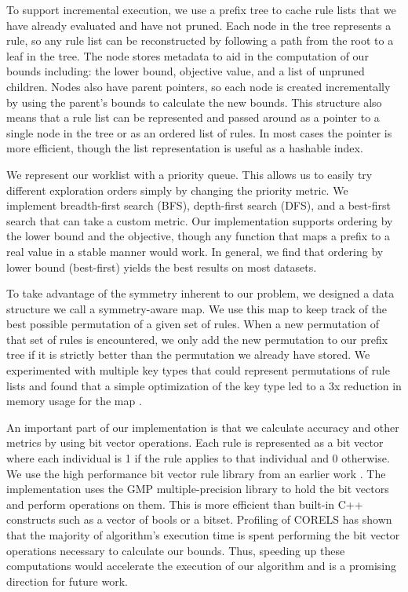 \documentclass[format=sigconf]{acmart}
\begin{document}
To support incremental execution, we use a prefix tree to cache rule lists that we have already evaluated and have not pruned.
Each node in the tree represents a rule, so any rule list can be reconstructed by following a path from the root to a leaf in the tree.
The node stores metadata to aid in the computation of our bounds including: the lower bound, objective value, and a list of unpruned children.
Nodes also have parent pointers, so each node is created incrementally by using the parent's bounds to calculate the new bounds.
This structure also means that a rule list can be represented and passed around as a pointer to a single node in the tree or as an ordered list of rules.
In most cases the pointer is more efficient, though the list representation is useful as a hashable index.

We represent our worklist with a priority queue.
This allows us to easily try different exploration orders simply by changing the priority metric.
We implement breadth-first search (BFS), depth-first search (DFS), and a best-first search that can take a custom metric.
Our implementation supports ordering by the lower bound and the objective, though any function that maps a prefix to a real value in a stable manner would work.
In general, we find that ordering by lower bound (best-first) yields the best results on most datasets.

To take advantage of the symmetry inherent to our problem, we designed a data structure we call a symmetry-aware map.
We use this map to keep track of the best possible permutation of a given set of rules.
When a new permutation of that set of rules is encountered, we only add the new permutation to our prefix tree if it is strictly better than the permutation we already have stored.
We experimented with multiple key types that could represent permutations of rule lists and found that a simple optimization of the key type led to a 3x reduction in memory usage for the map \cite{Larus-Stone17}.

An important part of our implementation is that we calculate accuracy and other metrics by using bit vector operations.
Each rule is represented as a bit vector where each individual is 1 if the rule applies to that individual and 0 otherwise.
We use the high performance bit vector rule library from an earlier work \cite{YangRuSe16}.
The implementation uses the GMP multiple-precision library to hold the bit vectors and perform operations on them.
This is more efficient than built-in C++ constructs such as a vector of bools or a bitset.
Profiling of CORELS has shown that the majority of algorithm's execution time is spent performing the bit vector operations necessary to calculate our bounds.
Thus, speeding up these computations would accelerate the execution of our algorithm and is a promising direction for future work.
\end{document}
